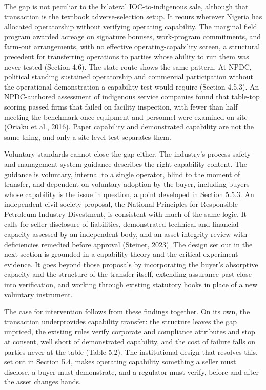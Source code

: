 \documentclass[twoside,fontset=lmodern]{mitthesis}
\begin{document}
The gap is not peculiar to the bilateral IOC-to-indigenous sale,
although that transaction is the textbook adverse-selection setup. It
recurs wherever Nigeria has allocated operatorship without verifying
operating capability. The marginal field program awarded acreage on
signature bonuses, work-program commitments, and farm-out arrangements,
with no effective operating-capability screen, a structural precedent
for transferring operations to parties whose ability to run them was
never tested (Section 4.6). The state route shows the same pattern. At
NPDC, political standing sustained operatorship and commercial
participation without the operational demonstration a capability test
would require (Section 4.5.3). An NPDC-authored assessment of indigenous
service companies found that table-top scoring passed firms that failed
on facility inspection, with fewer than half meeting the benchmark once
equipment and personnel were examined on site (Oriaku et al., 2016).
Paper capability and demonstrated capability are not the same thing, and
only a site-level test separates them.

Voluntary standards cannot close the gap either. The industry's
process-safety and management-system guidance describes the right
capability content. The guidance is voluntary, internal to a single
operator, blind to the moment of transfer, and dependent on voluntary
adoption by the buyer, including buyers whose capability is the issue in
question, a point developed in Section 5.5.3. An independent
civil-society proposal, the National Principles for Responsible
Petroleum Industry Divestment, is consistent with much of the same
logic. It calls for seller disclosure of liabilities, demonstrated
technical and financial capacity assessed by an independent body, and an
asset-integrity review with deficiencies remedied before approval
(Steiner, 2023). The design set out in the next section is grounded in a
capability theory and the critical-experiment evidence. It goes beyond
those proposals by incorporating the buyer's absorptive capacity and the
structure of the transfer itself, extending assurance past close into
verification, and working through existing statutory hooks in place of a
new voluntary instrument.

The case for intervention follows from these findings together. On its
own, the transaction underprovides capability transfer: the structure
leaves the gap unpriced, the existing rules verify corporate and
compliance attributes and stop at consent, well short of demonstrated
capability, and the cost of failure falls on parties never at the table
(Table 5.2). The institutional design that resolves this, set out in
Section 5.4, makes operating capability something a seller must
disclose, a buyer must demonstrate, and a regulator must verify, before
and after the asset changes hands.
\end{document}
